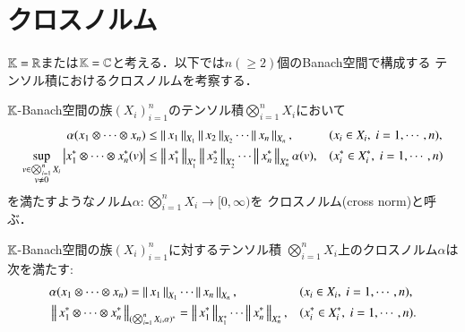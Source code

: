 \section{クロスノルム}
	$\mathbb{K} = \mathbb{R}$または$\mathbb{K}=\mathbb{C}$と考える．以下では$n (\geq 2)$個のBanach空間で構成する
	テンソル積におけるクロスノルムを考察する．
	\begin{screen}
		\begin{dfn}[クロスノルム]
			$\mathbb{K}$-Banach空間の族$(X_i)_{i=1}^n$のテンソル積$\bigotimes_{i=1}^n X_i$において
			\begin{align}
				\alpha(x_1 \otimes \cdots \otimes x_n) &\leq \left\|\, x_1\, \right\|_{X_1} \left\|\, x_2\, \right\|_{X_2} \cdots \left\|\, x_n\, \right\|_{X_n}, && (x_i \in X_i,\ i=1,\cdots,n), \label{eq:cross_norm_def_1}\\
				\operatorname*{sup}_{\substack{v \in \bigotimes_{i=1}^n X_i \\ v \neq 0}} \left| x_1^* \otimes \cdots \otimes x_n^* (v) \right| &\leq \left\|\, x_1^*\, \right\|_{X_1^*} \left\|\, x_2^*\, \right\|_{X_2^*} \cdots \left\|\, x_n^*\, \right\|_{X_n^*}\alpha(v),
				&& (x_i^* \in X_i^*,\ i=1,\cdots,n) \label{eq:cross_norm_def_2}
			\end{align}
			を満たすようなノルム$\alpha:\bigotimes_{i=1}^n X_i \longrightarrow [0,\infty)$を
			クロスノルム(cross norm)と呼ぶ．
		\end{dfn}
	\end{screen}
	
	\begin{screen}
		\begin{thm}
			$\mathbb{K}$-Banach空間の族$(X_i)_{i=1}^{n}$に対するテンソル積
			$\bigotimes_{i=1}^n X_i$上のクロスノルム$\alpha$は
			次を満たす:
			\begin{align}
				&\alpha(x_1 \otimes \cdots \otimes x_n) 
					= \left\|\, x_1\, \right\|_{X_1} \cdots \left\|\, x_n\, \right\|_{X_n}, && (x_i \in X_i,\ i=1,\cdots,n), \\
				&\left\|\, x_1^* \otimes \cdots \otimes x_n^*\, \right\|_{(\bigotimes_{i=1}^n X_i, \alpha)^*} 
					= \left\|\, x_1^*\, \right\|_{X_1^*} \cdots \left\|\, x_n^*\, \right\|_{X_n^*},
				&& (x_i^* \in X_i^*,\ i=1,\cdots,n).
			\end{align}
		\end{thm}
	\end{screen}
	
